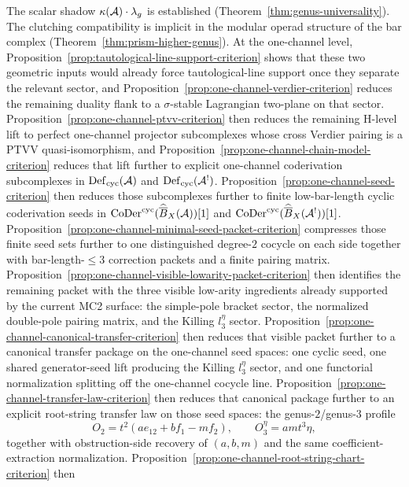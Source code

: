 \begin{remark}[Scope]\label{rem:universal-MC-scope}
The scalar shadow $\kappa(\mathcal{A}) \cdot \lambda_g$ is established
(Theorem~\ref{thm:genus-universality}).  The clutching compatibility
is implicit in the modular operad structure of the bar complex
(Theorem~\ref{thm:prism-higher-genus}).  At the one-channel level,
Proposition~\ref{prop:tautological-line-support-criterion} shows that
these two geometric inputs would already force tautological-line
support once they separate the relevant sector, and
Proposition~\ref{prop:one-channel-verdier-criterion} reduces the
remaining duality flank to a $\sigma$-stable Lagrangian two-plane on
that sector.  Proposition~\ref{prop:one-channel-ptvv-criterion} then
reduces the remaining H-level lift to perfect one-channel projector
subcomplexes whose cross Verdier pairing is a PTVV quasi-isomorphism,
and Proposition~\ref{prop:one-channel-chain-model-criterion} reduces
that lift further to explicit one-channel coderivation subcomplexes in
$\operatorname{Def}_{\mathrm{cyc}}(\mathcal{A})$ and $\operatorname{Def}_{\mathrm{cyc}}(\mathcal{A}^!)$.  Proposition~\ref{prop:one-channel-seed-criterion}
then reduces those subcomplexes further to finite low-bar-length
cyclic coderivation seeds in
$\operatorname{CoDer}^{\mathrm{cyc}}(\widehat{\overline{B}}_X(\mathcal{A}))[1]$ and
$\operatorname{CoDer}^{\mathrm{cyc}}(\widehat{\overline{B}}_X(\mathcal{A}^!))[1]$.
Proposition~\ref{prop:one-channel-minimal-seed-packet-criterion}
compresses those finite seed sets further to one distinguished
degree-$2$ cocycle on each side together with bar-length-$\leq 3$
correction packets and a finite pairing matrix.
Proposition~\ref{prop:one-channel-visible-lowarity-packet-criterion}
then identifies the remaining packet with the three visible low-arity
ingredients already supported by the current MC2 surface: the
simple-pole bracket sector, the normalized double-pole pairing matrix,
and the Killing $l_3^\eta$ sector.
Proposition~\ref{prop:one-channel-canonical-transfer-criterion} then
reduces that visible packet further to a canonical transfer package on
the one-channel seed spaces: one cyclic seed, one shared
generator-seed lift producing the Killing $l_3^\eta$ sector, and one
functorial normalization splitting off the one-channel cocycle line.
Proposition~\ref{prop:one-channel-transfer-law-criterion} then reduces
that canonical package further to an explicit root-string transfer law
on those seed spaces: the genus-$2$/genus-$3$ profile
\[
O_2=t^2(ae_{12}+bf_1-mf_2),
\qquad
O_3^\eta=a m t^3\eta,
\]
together with obstruction-side recovery of $(a,b,m)$ and the same
coefficient-extraction normalization.
Proposition~\ref{prop:one-channel-root-string-chart-criterion} then

\end{remark}
